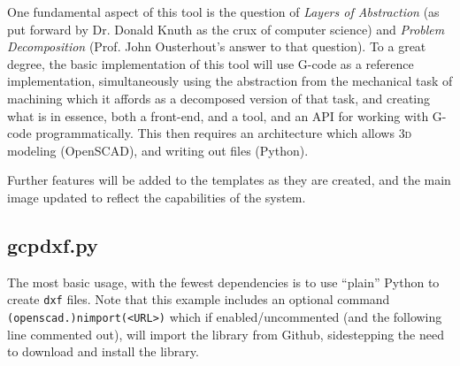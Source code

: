 \documentclass{ltxdoc}
\begin{document}
One fundamental aspect of this tool is the question of \emph{Layers of Abstraction} (as put forward by Dr. Donald Knuth as the crux of computer science) and \emph{Problem Decomposition} (Prof. John Ousterhout's answer to that question). To a great degree, the basic implementation of this tool will use G-code as a reference implementation, simultaneously using the abstraction from the mechanical task of machining which it affords as a decomposed version of that task, and creating what is in essence, both a front-end, and a tool, and an API for working with G-code programmatically. This then requires an architecture which allows \textsc{3d} modeling (OpenSCAD), and writing out files (Python).

Further features will be added to the templates as they are created, and the main image updated to reflect the capabilities of the system.

%
%
%
%
%

\subsection{gcpdxf.py}

The most basic usage, with the fewest dependencies is to use ``plain'' Python to create \verb|dxf| files. Note that this example includes an optional command \verb|(openscad.)nimport(<URL>)| which if enabled/uncommented (and the following line commented out), will import the library from Github, sidestepping the need to download and install the library.

\end{document}
